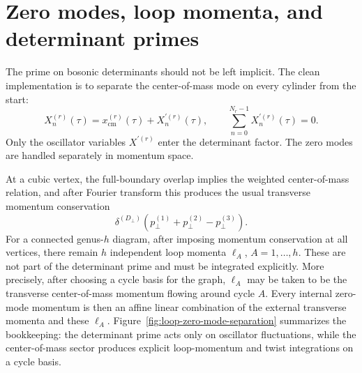 \documentclass[11pt]{article}
\numberwithin{equation}{section}
\newcommand{\perpD}{D_\perp}
\begin{document}
\section{Zero modes, loop momenta, and determinant primes}
The prime on bosonic determinants should not be left implicit. The clean implementation is to separate the center-of-mass mode on every cylinder from the start:
\begin{equation}
\label{eq:s17-001}
X_n^{(r)}(\tau)=x_{\mathrm{cm}}^{(r)}(\tau)+X_n^{\prime(r)}(\tau),
\qquad
\sum_{n=0}^{N_r-1} X_n^{\prime(r)}(\tau)=0.
\end{equation}
Only the oscillator variables $X^{\prime(r)}$ enter the determinant factor. The zero modes are handled separately in momentum space.

At a cubic vertex, the full-boundary overlap implies the weighted center-of-mass relation, and after Fourier transform this produces the usual transverse momentum conservation
\begin{equation}
\label{eq:s17-002}
\delta^{(\perpD)}(p^{(1)}_\perp+p^{(2)}_\perp-p^{(3)}_\perp).
\end{equation}
For a connected genus-$h$ diagram, after imposing momentum conservation at all vertices, there remain $h$ independent loop momenta $\ell_A$, $A=1,\dots,h$. These are not part of the determinant prime and must be integrated explicitly.
More precisely, after choosing a cycle basis for the graph, $\ell_A$ may be taken to be the transverse center-of-mass momentum flowing around cycle $A$. Every internal zero-mode momentum is then an affine linear combination of the external transverse momenta and these $\ell_A$.
Figure~\ref{fig:loop-zero-mode-separation} summarizes the bookkeeping: the determinant prime acts only on oscillator fluctuations, while the center-of-mass sector produces explicit loop-momentum and twist integrations on a cycle basis.
\end{document}
